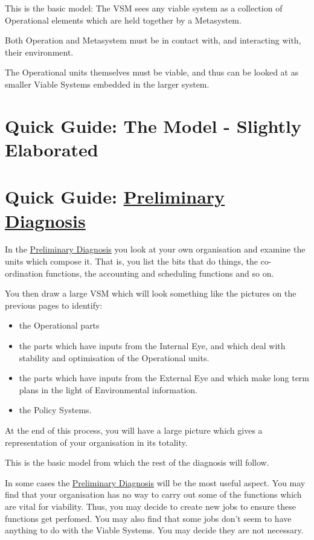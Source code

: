 This is the basic model: The VSM sees any viable system as a collection of Operational elements which are held together by a Metasystem.

Both Operation and Metasystem must be in contact with, and interacting with, their environment.

The Operational units themselves must be viable, and thus can be looked at as smaller Viable Systems embedded in the larger system.

\section*{Quick Guide: The Model - Slightly Elaborated}

\section*{Quick Guide: \href{https://vsmg.lrc.org.uk/3pd_5sys.html}{Preliminary Diagnosis}}
In the \href{https://vsmg.lrc.org.uk/3pd_5sys.html}{Preliminary Diagnosis} you look at your own organisation and examine the units which compose it. That is, you list the bits that do things, the co-ordination functions, the accounting and scheduling functions and so on.

You then draw a large VSM which will look something like the pictures on the previous pages to identify:

\begin{itemize}
  \item the Operational parts

  \item the parts which have inputs from the Internal Eye, and which deal with stability and optimisation of the Operational units.

  \item the parts which have inputs from the External Eye and which make long term plans in the light of Environmental information.

  \item the Policy Systems.

\end{itemize}

At the end of this process, you will have a large picture which gives a representation of your organisation in its totality.

This is the basic model from which the rest of the diagnosis will follow.

In some cases the \href{https://vsmg.lrc.org.uk/3pd_5sys.html}{Preliminary Diagnosis} will be the most useful aspect. You may find that your organisation has no way to carry out some of the functions which are vital for viability. Thus, you may decide to create new jobs to ensure these functions get perfomed. You may also find that some jobs don't seem to have anything to do with the Viable Systems. You may decide they are not necessary.

